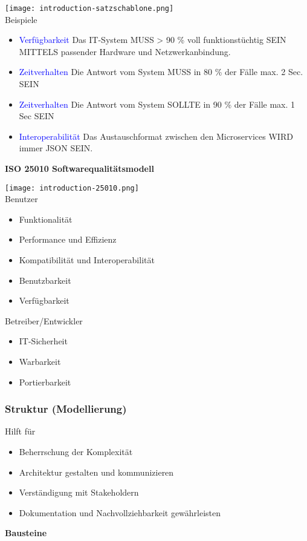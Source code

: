 \texttt{[image: introduction-satzschablone.png]} \\

Beispiele
\begin{itemize}
    \item \textcolor{blue}{Verfügbarkeit} Das IT-System MUSS > 90 \% voll funktionstüchtig SEIN MITTELS passender Hardware und Netzwerkanbindung.
    \item \textcolor{blue}{Zeitverhalten} Die Antwort vom System MUSS in 80 \% der Fälle max. 2 Sec. SEIN
    \item \textcolor{blue}{Zeitverhalten} Die Antwort vom System SOLLTE in 90 \% der Fälle max. 1 Sec SEIN
    \item \textcolor{blue}{Interoperabilität} Das Austauschformat zwischen den Microservices WIRD immer JSON SEIN.
\end{itemize}
\vspace{10pt}
\textbf{ISO 25010 Softwarequalitätsmodell}

\texttt{[image: introduction-25010.png]} \\

\columnbreak
Benutzer

\begin{itemize}
    \item Funktionalität
    \item Performance und Effizienz
    \item Kompatibilität und Interoperabilität
    \item Benutzbarkeit
    \item Verfügbarkeit
\end{itemize}
\vspace{10pt}
Betreiber/Entwickler

\begin{itemize}
    \item IT-Sicherheit
    \item Warbarkeit
    \item Portierbarkeit
\end{itemize}


\subsubsection{Struktur (Modellierung)}

Hilft für

\begin{itemize}
    \item Beherrschung der Komplexität
    \item Architektur gestalten und kommunizieren
    \item Verständigung mit Stakeholdern
    \item Dokumentation und Nachvollziehbarkeit gewährleisten
\end{itemize}
\vspace{10pt}
\textbf{Bausteine}

